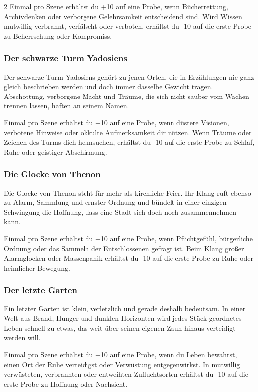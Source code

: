 {\begin{multicols*}{2}
        \bindungspielwertebox
        {Einmal pro Szene erhältst du +10 auf eine Probe, wenn Bücherrettung, Archivdenken oder verborgene Gelehrsamkeit entscheidend sind.}
        {Wird Wissen mutwillig verbrannt, verfälscht oder verboten, erhältst du -10 auf die erste Probe zu Beherrschung oder Kompromiss.}

        \subsubsection*{Der schwarze Turm Yadosiens}
        Der schwarze Turm Yadosiens gehört zu jenen Orten, die in Erzählungen nie ganz gleich beschrieben werden und doch immer dasselbe Gewicht tragen. Abschottung, verborgene Macht und Träume, die sich nicht sauber vom Wachen trennen lassen, haften an seinem Namen.

        \bindungspielwertebox
        {Einmal pro Szene erhältst du +10 auf eine Probe, wenn düstere Visionen, verbotene Hinweise oder okkulte Aufmerksamkeit dir nützen.}
        {Wenn Träume oder Zeichen des Turms dich heimsuchen, erhältst du -10 auf die erste Probe zu Schlaf, Ruhe oder geistiger Abschirmung.}

        \subsubsection*{Die Glocke von Thenon}
        Die Glocke von Thenon steht für mehr als kirchliche Feier. Ihr Klang ruft ebenso zu Alarm, Sammlung und ernster Ordnung und bündelt in einer einzigen Schwingung die Hoffnung, dass eine Stadt sich doch noch zusammennehmen kann.

        \bindungspielwertebox
        {Einmal pro Szene erhältst du +10 auf eine Probe, wenn Pflichtgefühl, bürgerliche Ordnung oder das Sammeln der Entschlossenen gefragt ist.}
        {Beim Klang großer Alarmglocken oder Massenpanik erhältst du -10 auf die erste Probe zu Ruhe oder heimlicher Bewegung.}

        \subsubsection*{Der letzte Garten}
        Ein letzter Garten ist klein, verletzlich und gerade deshalb bedeutsam. In einer Welt aus Brand, Hunger und dunklen Horizonten wird jedes Stück geordnetes Leben schnell zu etwas, das weit über seinen eigenen Zaun hinaus verteidigt werden will.

        \bindungspielwertebox
        {Einmal pro Szene erhältst du +10 auf eine Probe, wenn du Leben bewahrst, einen Ort der Ruhe verteidigst oder Verwüstung entgegenwirkst.}
        {In mutwillig verwüsteten, verbrannten oder entweihten Zufluchtsorten erhältst du -10 auf die erste Probe zu Hoffnung oder Nachsicht.}


\end{multicols*}}
